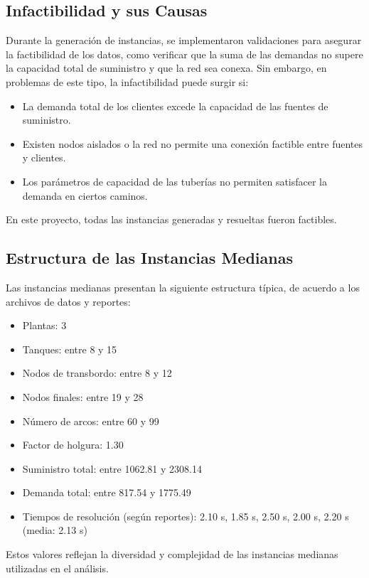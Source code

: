 \documentclass[a4paper,12pt]{article}
\begin{document}
\subsection{Infactibilidad y sus Causas}
Durante la generación de instancias, se implementaron validaciones para asegurar la factibilidad de los datos, como verificar que la suma de las demandas no supere la capacidad total de suministro y que la red sea conexa. Sin embargo, en problemas de este tipo, la infactibilidad puede surgir si:
\begin{itemize}
    \item La demanda total de los clientes excede la capacidad de las fuentes de suministro.
    \item Existen nodos aislados o la red no permite una conexión factible entre fuentes y clientes.
    \item Los parámetros de capacidad de las tuberías no permiten satisfacer la demanda en ciertos caminos.
\end{itemize}
En este proyecto, todas las instancias generadas y resueltas fueron factibles.

\subsection{Estructura de las Instancias Medianas}
Las instancias medianas presentan la siguiente estructura típica, de acuerdo a los archivos de datos y reportes:
\begin{itemize}
    \item Plantas: 3
    \item Tanques: entre 8 y 15
    \item Nodos de transbordo: entre 8 y 12
    \item Nodos finales: entre 19 y 28
    \item Número de arcos: entre 60 y 99
    \item Factor de holgura: 1.30
    \item Suministro total: entre 1062.81 y 2308.14
    \item Demanda total: entre 817.54 y 1775.49
    \item Tiempos de resolución (según reportes): 2.10 s, 1.85 s, 2.50 s, 2.00 s, 2.20 s (media: 2.13 s)
\end{itemize}
Estos valores reflejan la diversidad y complejidad de las instancias medianas utilizadas en el análisis.
\end{document}
